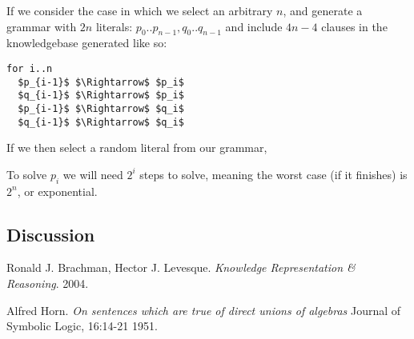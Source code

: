 \documentclass{article}
\begin{document}
If we consider the case in which we select an arbitrary $n$, and generate a grammar 
with $2n$ literals: $p_0 .. p_{n-1}, q_0 .. q_{n-1}$ and include $4n-4$ clauses in the knowledgebase
generated like so:

\begin{lstlisting}[mathescape=true]
for i..n
  $p_{i-1}$ $\Rightarrow$ $p_i$
  $q_{i-1}$ $\Rightarrow$ $p_i$
  $p_{i-1}$ $\Rightarrow$ $q_i$
  $q_{i-1}$ $\Rightarrow$ $q_i$
\end{lstlisting}

If we then select a random literal from our grammar, 

To solve $p_i$ we will need $2^i$ steps to solve, meaning the worst case (if it
finishes) is $2^n$, or exponential.

\subsection{Discussion}


\begin{thebibliography}{9}

  Ronald J. Brachman, Hector J. Levesque.
  \emph{Knowledge Representation \& Reasoning}.
  2004.

  Alfred Horn.
  \emph{On sentences which are true of direct unions of algebras}
  Journal of Symbolic Logic, 16:14-21
  1951.
\end{thebibliography}
\end{document}
